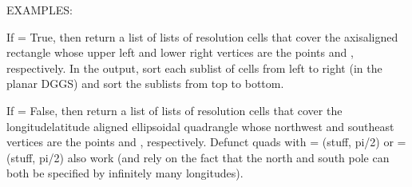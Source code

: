 \documentclass[a4paper,12ptopenany,oneside,english]{sphinxmanual}
\begin{document}
\begin{fulllineitems}
\begin{fulllineitems}
\sphinxAtStartPar
EXAMPLES:

\begin{sphinxVerbatim}[commandchars=\\\{\}]
  
     
\PYG{p}{[}    \PYG{p}{]}
\end{sphinxVerbatim}

\end{fulllineitems}


\begin{fulllineitems}
\label{\detokenize{dggs:rhealpixdggs.dggs.RHEALPixDGGS.cells_from_region}}
\pysigstartsignatures
{}
\pysigstopsignatures
\sphinxAtStartPar
If  = True, then return a list of lists of resolution
 cells that cover the axis\sphinxhyphen{}aligned rectangle whose
upper left and lower right vertices are the points  and ,
respectively.
In the output, sort each sublist of cells from left to right (in the
planar DGGS) and sort the sublists from top to bottom.

\sphinxAtStartPar
If  = False, then return a list of lists of resolution
cells that cover the longitude\sphinxhyphen{}latitude aligned ellipsoidal quadrangle
whose northwest and southeast vertices are the points  and ,
respectively. Defunct quads with  = (stuff, pi/2) or
 = (stuff, \sphinxhyphen{}pi/2) also work
(and rely on the fact that the north and south pole can both
be specified by infinitely many longitudes).


\end{fulllineitems}
\end{fulllineitems}
\end{document}
